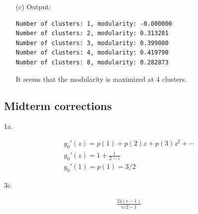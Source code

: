 \documentclass{article}
\begin{document}
\begin{enumerate}
  \item[(c)]
  Output:
  \begin{verbatim}
Number of clusters: 1, modularity: -0.000000
Number of clusters: 2, modularity: 0.313281
Number of clusters: 3, modularity: 0.399080
Number of clusters: 4, modularity: 0.419790
Number of clusters: 8, modularity: 0.282873
  \end{verbatim}

  It seems that the modularity is maximized at 4 clusters.

\end{enumerate}

\newpage

\subsection*{Midterm corrections}

1a.

\begin{gather*}
  g_0'(z) = p(1) + p(2) z + p(3) z^2 + \dotsb \\
  g_0'(z) = 1 + \frac{1}{2 - z} \\
  g_0'(1) = p(1) = \boxed{3/2}
\end{gather*}

3c.

\begin{gather*}
  \frac{24(c - 1)}{c / 2 - 1}
\end{gather*}

\newpage
\end{document}
